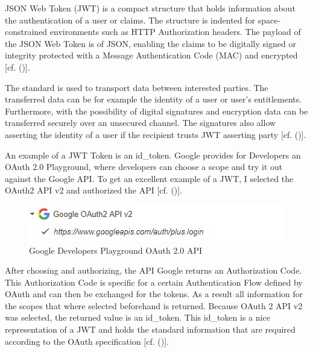 {JSON Web Token (JWT) is a compact structure that holds information about the authentication of a user or claims. The structure is indented for space-constrained environments such as HTTP Authorization headers. The payload of the JSON Web Token is of JSON, enabling the claims to be digitally signed or integrity protected with a Message Authentication Code (MAC) and encrypted [cf. (\cite{JWT:IETF:Jones:2015})].

The standard is used to transport data between interested parties. The transferred data can be for example the identity of a user or user’s entitlements. Furthermore, with the possibility of digital signatures and encryption data can be transferred securely over an unsecured channel. The signatures also allow asserting the identity of a user if the recipient trusts JWT asserting party [cf. (\cite{Siriwardena:JWTJWSJWE:2016})].

An example of a JWT Token is an id\_token. Google provides for Developers an OAuth 2.0 Playground, where developers can choose a scope and try it out against the Google API. To get an excellent example of a JWT, I selected the OAuth2 API v2 and authorized the API [cf. (\cite{Google:2018:OAuthPlayground})].


\begin{figure}[h]
	\centering
	\includegraphics[width=0.8\linewidth]{images/googleOAuthPlaygroundOAuthAPI}
	\caption[OAuth API]{Google Developers Playground OAuth 2.0 API}
	\label{fig:googleoauthplaygroundoauthapi}
\end{figure}

After choosing and authorizing, the API Google returns an Authorization Code. This Authorization Code is specific for a certain Authentication Flow defined by OAuth and can then be exchanged for the tokens. As a result all information for the scopes that where selected beforehand is returned. Because OAuth 2 API v2 was selected, the returned value is an id\_token. This id\_token is a nice representation of a JWT and holds the standard information that are required according to the OAuth specification  [cf. (\cite{Google:2018:OAuthPlayground})].



}
